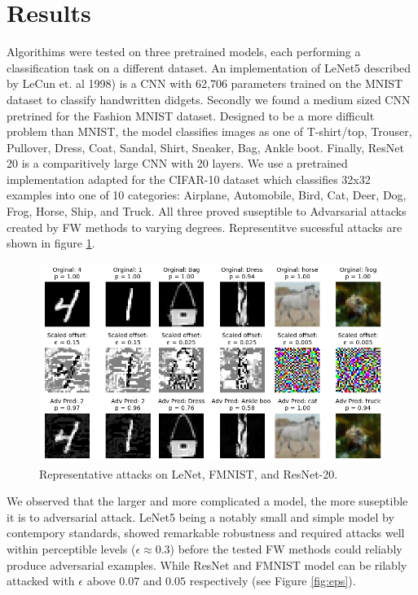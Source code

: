\documentclass{article}
\begin{document}
\section{Results}
Algorithims were tested on three pretrained models, each performing a classification task on a different dataset. An implementation of LeNet5 described by LeCun et. al 1998) is a CNN with 62,706 parameters trained on the MNIST dataset to classify handwritten didgets. 
Secondly we found a medium sized CNN pretrined for the Fashion MNIST dataset. Designed to be a more difficult problem than MNIST, the model classifies images as one of T-shirt/top, Trouser, Pullover, Dress, Coat, Sandal, Shirt, Sneaker, Bag, Ankle boot. 
Finally, ResNet 20 is a comparitively large CNN with 20 layers. We use a pretrained implementation adapted for the CIFAR-10 dataset which classifies 32x32 examples into one of 10 categories: Airplane, Automobile, Bird, Cat, Deer, Dog, Frog, Horse, Ship, and Truck. All three proved suseptible to Advarsarial attacks created by FW methods to varying degrees. Representitve sucessful attacks are shown in figure \ref{fig:adv_ex}.

\begin{figure}[H]
    \centering
    \includegraphics[width=\textwidth]{plots/adv_ex.png}
    \caption{Representative attacks on LeNet, FMNIST, and ResNet-20.}
    \label{fig:adv_ex}
\end{figure}

We observed that the larger and more complicated a model, the more suseptible it is to adversarial attack. 
LeNet5 being a notably small and simple model by contempory standards, showed remarkable robustness and required attacks well within perceptible levels ($\epsilon \approx 0.3$) before the tested FW methods could reliably produce adversarial examples. While ResNet and FMNIST model can be rilably attacked with $\epsilon$ above $0.07$ and $0.05$ respectively (see Figure \ref{fig:eps}).
\end{document}
